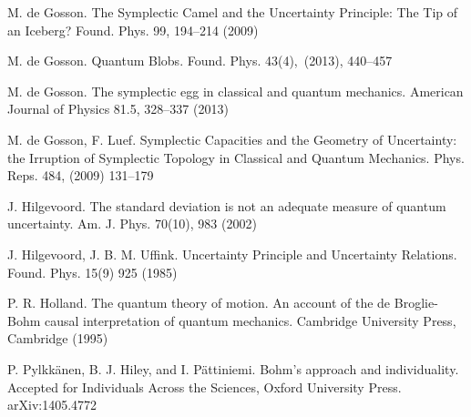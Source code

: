 \documentclass[11pt]{article}%
\begin{document}
\begin{thebibliography}{99}
M. de Gosson. The Symplectic Camel and the Uncertainty
Principle: The Tip of an Iceberg? Found. Phys. 99, 194--214 (2009)

M. de Gosson. Quantum Blobs. Found. Phys. 43(4),\ (2013), 440--457

M. de Gosson. The symplectic egg in classical and quantum
mechanics. American Journal of Physics 81.5, 328--337 (2013)

M. de Gosson, F. Luef. Symplectic Capacities and the Geometry
of Uncertainty: the Irruption of Symplectic Topology in Classical and Quantum
Mechanics. Phys. Reps. 484, (2009) 131--179

J. Hilgevoord. The standard deviation is not an adequate
measure of quantum uncertainty. Am. J. Phys. 70(10), 983 (2002)

J. Hilgevoord, J. B. M. Uffink. Uncertainty Principle and
Uncertainty Relations. Found. Phys. 15(9) 925 (1985)

P. R. Holland. The quantum theory of motion. An account of
the de Broglie-Bohm causal interpretation of quantum mechanics. Cambridge
University Press, Cambridge (1995)

P. Pylkk\"{a}nen, B. J. Hiley, and I. P\"{a}ttiniemi.
Bohm's approach and individuality. Accepted for Individuals Across the
Sciences, Oxford University Press. arXiv:1405.4772
\end{thebibliography}
\end{document}
